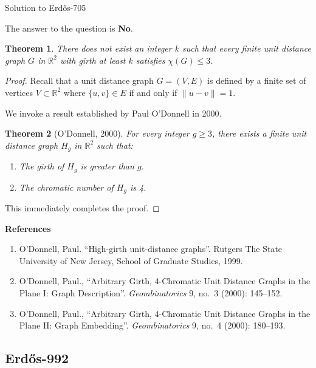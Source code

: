 \documentclass{article}
\theoremstyle{plain}
\newtheorem{theorem}{Theorem}
\theoremstyle{definition}
\begin{document}
\begin{solution}{Solution to {Erdős-705}}

The answer to the question is \textbf{No}.

\begin{theorem}
    There does not exist an integer $k$ such that every finite unit distance graph $G$ in $\mathbb{R}^2$ with girth at least $k$ satisfies $\chi(G) \leq 3$. 
\end{theorem}

\begin{proof}
Recall that a unit distance graph $G = (V, E)$ is defined by a finite set of vertices $V \subset \mathbb{R}^2$ where $\{u, v\} \in E$ if and only if $\|u - v\| = 1$.

We invoke a result established by Paul O'Donnell in 2000.

\begin{theorem}[O'Donnell, 2000]
For every integer $g \ge 3$, there exists a finite unit distance graph $H_g$ in $\mathbb{R}^2$ such that:
\begin{enumerate}
    \item The girth of $H_g$ is greater than $g$.
    \item The chromatic number of $H_g$ is 4.
\end{enumerate}
\end{theorem}

This immediately completes the proof. 
\end{proof}


\medskip
\textbf{References}
\begin{enumerate}
    \item \cite{OD99Thesis} O'Donnell, Paul. ``High-girth unit-distance graphs''. Rutgers The State University of New Jersey, School of Graduate Studies, 1999.
    
    \item \cite{OD00I}  O'Donnell, Paul., ``Arbitrary Girth, 4-Chromatic Unit Distance Graphs in the Plane I: Graph Description''. \textit{Geombinatorics} 9, no.~3 (2000): 145–152.
    
    \item \cite{OD00II} O'Donnell, Paul., ``Arbitrary Girth, 4-Chromatic Unit Distance Graphs in the Plane II: Graph Embedding''. \textit{Geombinatorics} 9, no.~4 (2000): 180–193.
\end{enumerate}
		
\end{solution}											

\subsection{Erdős-992}
\end{document}
